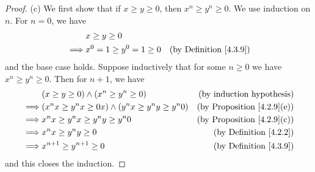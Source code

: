 \begin{proof}{(c)}
    We first show that if \(x \geq y \geq 0\), then \(x^n \geq y^n \geq 0\).
    We use induction on \(n\).
    For \(n = 0\), we have
    \begin{align*}
                 & x \geq y \geq 0                                                  \\
        \implies & x^0 = 1 \geq y^0 = 1 \geq 0 & \text{(by Definition \ref{4.3.9})}
    \end{align*}
    and the base case holds.
    Suppose inductively that for some \(n \geq 0\) we have \(x^n \geq y^n \geq 0\).
    Then for \(n + 1\), we have
    \begin{align*}
                 & (x \geq y \geq 0) \land (x^n \geq y^n \geq 0)                  & \text{(by induction hypothesis)}       \\
        \implies & (x^n x \geq y^n x \geq 0x) \land (y^n x \geq y^n y \geq y^n 0) & \text{(by Proposition \ref{4.2.9}(e))} \\
        \implies & x^n x \geq y^n x \geq y^n y \geq y^n 0                         & \text{(by Proposition \ref{4.2.9}(c))} \\
        \implies & x^n x \geq y^n y \geq 0                                        & \text{(by Definition \ref{4.2.2})}     \\
        \implies & x^{n + 1} \geq y^{n + 1} \geq 0                                & \text{(by Definition \ref{4.3.9})}
    \end{align*}
    and this closes the induction.


\end{proof}
